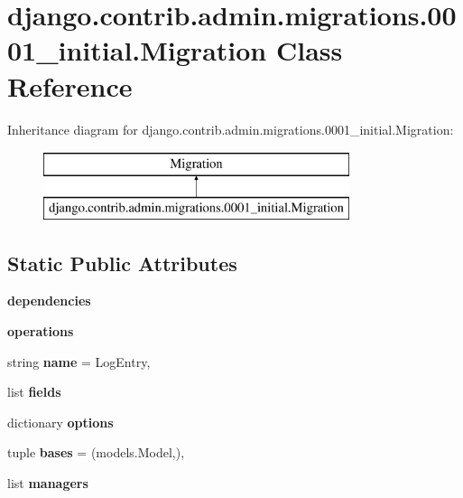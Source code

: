 \hypertarget{classdjango_1_1contrib_1_1admin_1_1migrations_1_10001__initial_1_1_migration}{}\section{django.\+contrib.\+admin.\+migrations.0001\+\_\+initial.Migration Class Reference}
\label{classdjango_1_1contrib_1_1admin_1_1migrations_1_10001__initial_1_1_migration}
Inheritance diagram for django.\+contrib.\+admin.\+migrations.0001\+\_\+initial.Migration\+:\begin{figure}[H]
\begin{center}
\leavevmode
\includegraphics[height=2.000000cm]{classdjango_1_1contrib_1_1admin_1_1migrations_1_10001__initial_1_1_migration}
\end{center}
\end{figure}
\subsection*{Static Public Attributes}
\begin{DoxyCompactItemize}
\item 
\mbox{\label{classdjango_1_1contrib_1_1admin_1_1migrations_1_10001__initial_1_1_migration_a765e6f4134fbe6f47bf9afbf5798afcb}} 
{\bfseries dependencies}
\item 
\mbox{\label{classdjango_1_1contrib_1_1admin_1_1migrations_1_10001__initial_1_1_migration_aea4e3e5bc2a503deb94e6caab07de924}} 
{\bfseries operations}
\item 
\mbox{\label{classdjango_1_1contrib_1_1admin_1_1migrations_1_10001__initial_1_1_migration_add4934d8db65d807a5e8da2a345cc913}} 
string {\bfseries name} = \textquotesingle{}Log\+Entry\textquotesingle{},
\item 
list {\bfseries fields}
\item 
dictionary {\bfseries options}
\item 
\mbox{\label{classdjango_1_1contrib_1_1admin_1_1migrations_1_10001__initial_1_1_migration_a2c83963c446cfb5554247983320eb144}} 
tuple {\bfseries bases} = (models.\+Model,),
\item 
list {\bfseries managers}
\end{DoxyCompactItemize}


